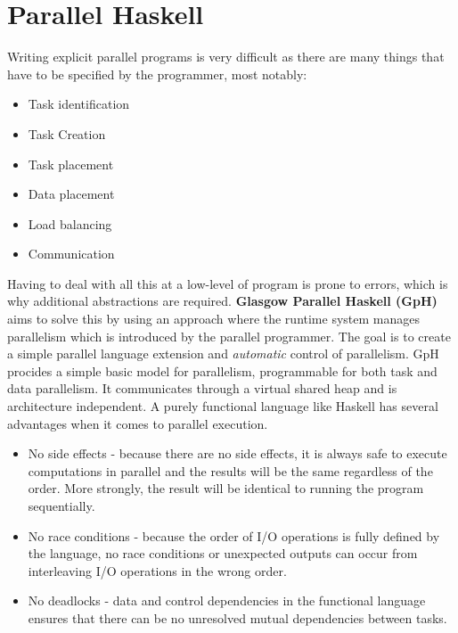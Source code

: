 \documentclass[CS4204-Notes.tex]{subfiles}
\begin{document}
\section{Parallel Haskell}
Writing explicit parallel programs is very difficult as there are many things that have to be specified by the programmer, most notably:
\begin{itemize}
\item Task identification
\item Task Creation
\item Task placement
\item Data placement
\item Load balancing
\item Communication
\end{itemize}
Having to deal with all this at a low-level of program is prone to errors, which is why additional abstractions are required. \textbf{Glasgow Parallel Haskell (GpH)} aims to solve this by using an approach where the runtime system manages parallelism which is introduced by the parallel programmer. The goal is to create a simple parallel language extension and \textit{automatic} control of parallelism. GpH procides a simple basic model for parallelism, programmable for both task and data parallelism. It communicates through a virtual shared heap and is architecture independent. 
\n
A purely functional language like Haskell has several advantages when it comes to parallel execution.
\begin{itemize}
\item No side effects - because there are no side effects, it is always safe to execute computations in parallel and the results will be the same regardless of the order. More strongly, the result will be identical to running the program sequentially.
\item No race conditions - because the order of I/O operations is fully defined by the language, no race conditions or unexpected outputs can occur from interleaving I/O operations in the wrong order.
\item No deadlocks - data and control dependencies in the functional language ensures that there can be no unresolved mutual dependencies between tasks.
\end{itemize}
\end{document}

